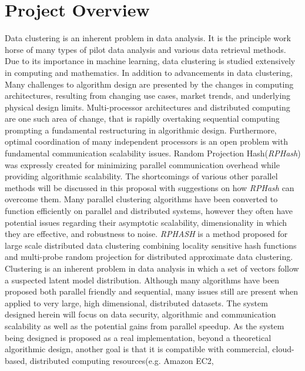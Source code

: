 \documentclass[a4paper,10pt]{article}
\begin{document}
\section{Project Overview}
Data clustering is
an inherent problem in data analysis.	It is the principle work horse of many
types of pilot data analysis and various data retrieval methods.  Due to
its importance in machine learning, data clustering is studied extensively
in computing and mathematics\cite{anderberg1973,Samet,clusters}.  In addition 
to advancements in data clustering, 
Many challenges to algorithm design are presented by the changes in computing architectures, resulting from changing use cases, market trends, and underlying 
physical design limits. Multi-processor architectures
and distributed computing are one such area of change, that is rapidly 
overtaking sequential computing 
prompting a fundamental restructuring in algorithmic design\cite{waldo1997}.
Furthermore, optimal coordination of many independent processors is an open
problem with fundamental communication scalability issues\cite{Amdahl}.
Random Projection Hash(\emph{RPHash}) was expressly created for minimizing
parallel communication overhead while providing algorithmic scalability.
The shortcomings of various other parallel methods will be discussed in
this proposal with suggestions on how \emph{RPHash} can overcome them.
Many parallel clustering algorithms have been converted to function
efficiently on parallel and distributed systems, however they often have
potential issues regarding their asymptotic scalability\cite{Proclus},
dimensionality in which they are effective\cite{Clarans}, and robustness
to noise.
\emph{RPHASH} is a method proposed for large scale distributed data clustering
combining locality sensitive hash functions and multi-probe random projection
for distributed approximate data clustering.  Clustering is an inherent
problem in data analysis in which a set of vectors follow a suspected latent
model distribution\cite{latent1,Hofmann,clusterstats,Zass2005}.  Although
many algorithms have been proposed both parallel friendly and sequential,
many issues still are present when applied to very large, high dimensional,
distributed datasets\cite{Clarans,Proclus,mpicluster,distributeddata,parclus}.
The system designed herein will focus on data security, algorithmic and
communication scalability as well as the potential gains from parallel speedup.
As the system being designed is proposed as a real implementation, beyond a
theoretical algorithmic design, another goal is that it is compatible with
commercial, cloud-based, distributed computing resources(e.g.  Amazon EC2,
\end{document}

